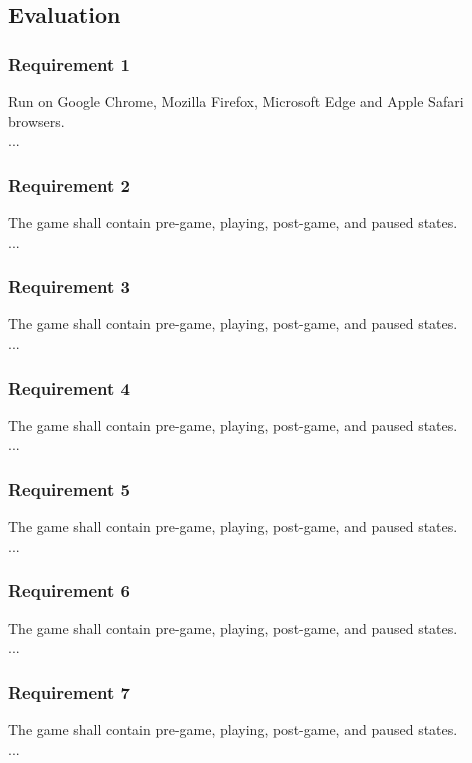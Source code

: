 \documentclass[12pt, titlepage]{article}
\begin{document}
\subsection{Evaluation}
\subsubsection{Requirement 1}
Run on Google Chrome, Mozilla Firefox, Microsoft Edge and Apple Safari browsers.\\
...\\
\subsubsection{Requirement 2}
The game shall contain pre-game, playing, post-game, and paused states.\\
...\\
\subsubsection{Requirement 3}
The game shall contain pre-game, playing, post-game, and paused states.\\
...\\
\subsubsection{Requirement 4}
The game shall contain pre-game, playing, post-game, and paused states.\\
...\\
\subsubsection{Requirement 5}
The game shall contain pre-game, playing, post-game, and paused states.\\
...\\
\subsubsection{Requirement 6}
The game shall contain pre-game, playing, post-game, and paused states.\\
...\\
\subsubsection{Requirement 7}
The game shall contain pre-game, playing, post-game, and paused states.\\
...\\
\end{document}
